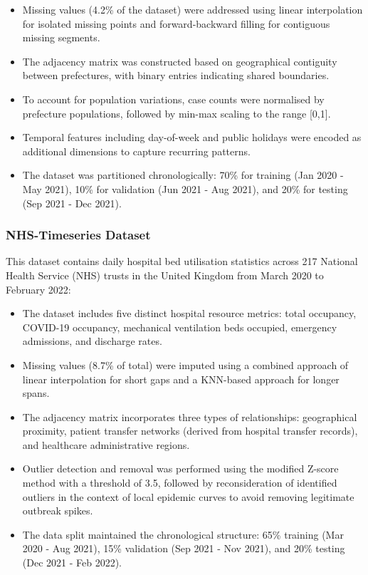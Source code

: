 \documentclass[lettersize, journal]{IEEEtran}
\begin{document}
\begin{itemize}
    \item Missing values (4.2\% of the dataset) were addressed using linear interpolation for isolated missing points and forward-backward filling for contiguous missing segments.
    
    \item The adjacency matrix was constructed based on geographical contiguity between prefectures, with binary entries indicating shared boundaries.
    
    \item To account for population variations, case counts were normalised by prefecture populations, followed by min-max scaling to the range [0,1].
    
    \item Temporal features including day-of-week and public holidays were encoded as additional dimensions to capture recurring patterns.
    
    \item The dataset was partitioned chronologically: 70\% for training (Jan 2020 - May 2021), 10\% for validation (Jun 2021 - Aug 2021), and 20\% for testing (Sep 2021 - Dec 2021).
\end{itemize}

\subsubsection{NHS-Timeseries Dataset}
This dataset contains daily hospital bed utilisation statistics across 217 National Health Service (NHS) trusts in the United Kingdom from March 2020 to February 2022:

\begin{itemize}
    \item The dataset includes five distinct hospital resource metrics: total occupancy, COVID-19 occupancy, mechanical ventilation beds occupied, emergency admissions, and discharge rates.
    
    \item Missing values (8.7\% of total) were imputed using a combined approach of linear interpolation for short gaps and a KNN-based approach for longer spans.
    
    \item The adjacency matrix incorporates three types of relationships: geographical proximity, patient transfer networks (derived from hospital transfer records), and healthcare administrative regions.
    
    \item Outlier detection and removal was performed using the modified Z-score method with a threshold of 3.5, followed by reconsideration of identified outliers in the context of local epidemic curves to avoid removing legitimate outbreak spikes.
    
    \item The data split maintained the chronological structure: 65\% training (Mar 2020 - Aug 2021), 15\% validation (Sep 2021 - Nov 2021), and 20\% testing (Dec 2021 - Feb 2022).
\end{itemize}
\end{document}
